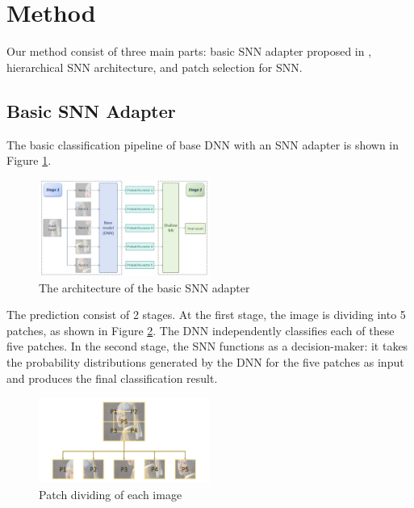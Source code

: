 \section{Method}
Our method consist of three main parts: basic SNN adapter proposed in \cite{imran2023artistic}, hierarchical SNN architecture, and patch selection for SNN.
\subsection{Basic SNN Adapter}
The basic classification pipeline of base DNN with an SNN adapter is shown in Figure \ref{fig:architecture}.

\begin{figure}[h]
    \centering
    \includegraphics[width=0.5\textwidth]{fig/mainpipline.jpg}
    \caption{The architecture of the basic SNN adapter}
    \label{fig:architecture}
\end{figure}
The prediction consist of 2 stages. At the first stage, the image is dividing into 5 patches, as shown in Figure \ref{fig:patches}. The DNN independently 
classifies each of these five patches. In the second stage, the SNN functions as a decision-maker:  it takes the 
probability distributions generated by the DNN for the five patches as input and produces the final classification result.
\begin{figure}[h]
    \centering
    \includegraphics[width=0.5\textwidth]{fig/patch.png}
    \caption{Patch dividing of each image}
    \label{fig:patches}
\end{figure}

